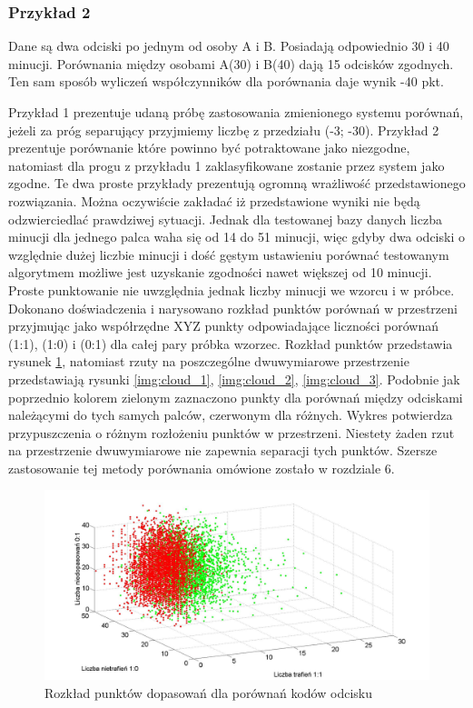 \subsubsection{Przykład 2}
Dane są dwa odciski po jednym od osoby A i B. Posiadają odpowiednio 30 i 40 minucji. Porównania między osobami A(30) i B(40) dają 15 odcisków zgodnych. Ten sam sposób wyliczeń współczynników dla porównania daje wynik -40 pkt. 
\vspace{.5cm}\par
Przykład 1 prezentuje udaną próbę zastosowania zmienionego systemu porównań, jeżeli za próg separujący przyjmiemy liczbę z przedziału (-3; -30). Przykład 2 prezentuje porównanie które powinno być potraktowane jako niezgodne, natomiast dla progu z przykładu 1 zaklasyfikowane zostanie przez system jako zgodne. Te dwa proste przykłady prezentują ogromną wrażliwość przedstawionego rozwiązania. Można oczywiście zakładać iż przedstawione wyniki nie będą odzwierciedlać prawdziwej sytuacji. Jednak dla testowanej bazy danych liczba minucji dla jednego palca waha się od 14 do 51 minucji, więc gdyby dwa odciski o względnie dużej liczbie minucji i dość gęstym ustawieniu porównać testowanym algorytmem możliwe jest uzyskanie zgodności nawet większej od 10 minucji. Proste punktowanie nie uwzględnia jednak liczby minucji we wzorcu i w próbce. Dokonano doświadczenia i narysowano rozkład punktów porównań w przestrzeni przyjmując jako współrzędne XYZ punkty odpowiadające liczności porównań (1:1), (1:0) i (0:1) dla całej pary próbka wzorzec. Rozkład punktów przedstawia rysunek \ref{img:cloud_all}, natomiast rzuty na poszczególne dwuwymiarowe przestrzenie przedstawiają rysunki \ref{img:cloud_1}, \ref{img:cloud_2}, \ref{img:cloud_3}. Podobnie jak poprzednio kolorem zielonym zaznaczono punkty dla porównań między odciskami należącymi do tych samych palców, czerwonym dla różnych. Wykres potwierdza przypuszczenia o różnym rozłożeniu punktów w przestrzeni. Niestety żaden rzut na przestrzenie dwuwymiarowe nie zapewnia separacji tych punktów. Szersze zastosowanie tej metody porównania omówione zostało w rozdziale 6.

\begin{figure}[!hbt]
    \begin{center}
		\includegraphics[angle=0,scale=0.27]{img/cloud.jpg}
		\caption{Rozkład punktów dopasowań dla porównań kodów odcisku}
		\label{img:cloud_all}
    \end{center}
\end{figure} 

